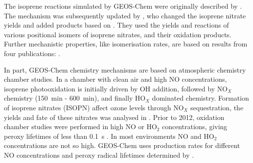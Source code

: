     The isoprene reactions simulated by GEOS-Chem were originally described by \textcite{Horowitz1998}.
    The mechanism was subsequently updated by \textcite{Mao2013}, who changed the isoprene nitrate yields and added products based on \textcite{Paulot2009a, Paulot2009b}.
    They used the yields and reactions of various positional isomers of isoprene nitrates, and their oxidation products. %
    Further mechanistic properties, like isomerisation rates, are based on results from four publications: \textcite{Peeters2009, Peeters2010, Crounse2011, Crounse2012}.
    
    In part, GEOS-Chem chemistry mechanisms are based on atmospheric chemistry chamber studies.
    In a chamber with clean air and high NO concentrations, isoprene photooxidation is initially driven by OH addition, followed by NO$_X$ chemistry (150~min - 600~min), and finally HO$_X$ dominated chemistry.
    Formation of isoprene nitrates (ISOPN) affect ozone levels through NO$_X$ sequestration, the yields and fate of these nitrates was analysed in \textcite{Paulot2009a}.
    Prior to 2012, oxidation chamber studies were performed in high NO or HO$_2$ concentrations, giving peroxy lifetimes of less than 0.1~s \parencite{Crounse2012, Wolfe2012}.
    In most environments NO and HO$_2$ concentrations are not so high.
    GEOS-Chem uses production rates for different NO concentrations and peroxy radical lifetimes determined by \textcite{Mao2013}.
    
